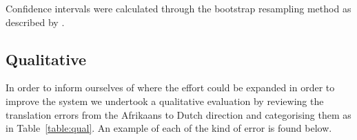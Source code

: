 \documentclass[11pt]{article}
\begin{document}
%     
%     
%     
%
%
%     
%     
%     
%     




Confidence intervals were calculated through the bootstrap 
resampling method as described by .


\subsection{Qualitative}

In order to inform ourselves of where the effort could be expanded in order to improve the 
system we undertook a qualitative evaluation by reviewing the translation errors from the Afrikaans
to Dutch direction and categorising them as in Table~\ref{table:qual}. An example of each 
of the kind of error is found below.
\end{document}
